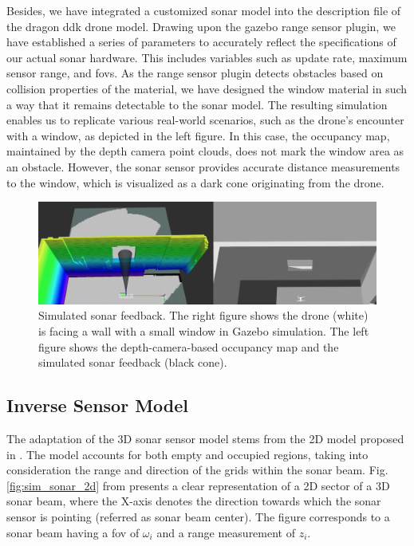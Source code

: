 Besides, we have integrated a customized sonar model into the description file of the dragon ddk drone model. Drawing upon the gazebo range sensor plugin, we have established a series of parameters to accurately reflect the specifications of our actual sonar hardware. This includes variables such as update rate, maximum sensor range, and \glspl{fov}. As the range sensor plugin detects obstacles based on collision properties of the material, we have designed the window material in such a way that it remains detectable to the sonar model. The resulting simulation enables us to replicate various real-world scenarios, such as the drone's encounter with a window, as depicted in the left figure. In this case, the occupancy map, maintained by the depth camera point clouds, does not mark the window area as an obstacle. However, the sonar sensor provides accurate distance measurements to the window, which is visualized as a dark cone originating from the drone.

\begin{figure}[h]
    \centering
    \includegraphics[width=1.0\columnwidth]{fig/sim_sonar.png}
    \caption{Simulated sonar feedback. The right figure shows the drone (white) is facing a wall with a small window in Gazebo simulation. The left figure shows the depth-camera-based occupancy map and the simulated sonar feedback (black cone).}
    \label{fig:sim_sonar}
\end{figure}

\subsection{Inverse Sensor Model}
\label{sec:method_model}
The adaptation of the 3D sonar sensor model stems from the 2D model proposed in \cite{wideanglesonar}. The model accounts for both empty and occupied regions, taking into consideration the range and direction of the grids within the sonar beam. Fig. \ref{fig:sim_sonar_2d}  from \cite{advanced_sonar_sensor} presents a clear representation of a 2D sector of a 3D sonar beam, where the X-axis denotes the direction towards which the sonar sensor is pointing (referred as sonar beam center). The figure corresponds to a sonar beam having a \gls{fov} of $\omega_i$ and a range measurement of $z_i$.

